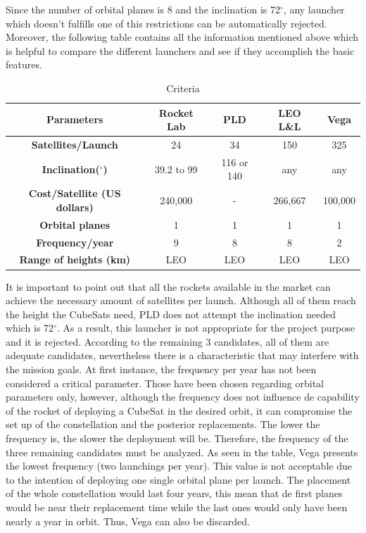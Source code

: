 Since the number of orbital planes is 8 and the inclination is 72$^{\circ}$, any launcher which doesn't fulfills one of this restrictions can be automatically rejected. 
\newline
\newline
 Moreover, the following table contains all the information mentioned above which is helpful to compare the different launchers and see if they accomplish the basic features. 
\newline	
	\begin{table}[h]
	\begin{center}
	\begin{tabular}{|c|c|c|c|c|}
	\hline
	 \bf{Parameters} & \bf{Rocket Lab} & \bf{PLD} & \bf{LEO L\&L} & \bf{Vega}\\
	\hline 
	\bf{Satellites/Launch} & 24 & 34 & 150 & 325 \\
	\hline 
	\bf{Inclination($^{\circ}$) } & {39.2 to 99} & {116 or 140} & {any} & {any}\\
	\hline 
	 \bf{Cost/Satellite (US dollars)} & 240,000 & - & 266,667 & 100,000\\
	\hline 
	\bf{Orbital planes} & 1 & 1 & 1 & 1 \\
	\hline 
	\bf{Frequency/year} & 9 & 8 & 8 & 2 \\
	\hline 
	\bf{Range of heights (km)} & LEO & LEO & LEO & LEO\\
	\hline
	\end{tabular}
	\end{center}
	\caption{Criteria}
	\end{table} 
\newline
\newline
It is important to point out that all the rockets available in the market can achieve the necessary amount of satellites per launch. Although all of them reach the height the CubeSats need, PLD does not attempt the inclination needed which is 72$^{\circ}$. As a result, this launcher is not appropriate for the project purpose and it is rejected. 
According to the remaining 3 candidates, all of them are adequate candidates, nevertheless there is a characteristic that may interfere with the mission goals. At first instance, the frequency per year has not been considered a critical parameter. Those have been chosen regarding orbital parameters only, however, although the frequency does not influence de capability of the rocket of deploying a CubeSat in the desired orbit, it can compromise the set up of the constellation and the posterior replacements. The lower the frequency is, the slower the deployment will be. Therefore, the frequency of the three remaining candidates must be analyzed. As seen in the table, Vega presents the lowest frequency (two launchings per year). This value is not acceptable due to the intention of deploying one single orbital plane per launch. The placement of the whole constellation would last four years, this mean that de first planes would be near their replacement time while the last ones would only have been nearly a year in orbit. Thus, Vega can also be discarded. 
